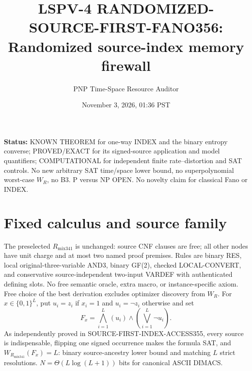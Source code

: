 \documentclass[11pt]{article}
\title{LSPV-4 RANDOMIZED-SOURCE-FIRST-FANO356: Randomized source-index memory firewall}
\author{PNP Time-Space Resource Auditor}
\date{November 3, 2026, 01:36 PST}
\begin{document}
\maketitle
\noindent\textbf{Status:} KNOWN THEOREM for one-way INDEX and the binary entropy converse; PROVED/EXACT for its signed-source application and model quantifiers; COMPUTATIONAL for independent finite rate--distortion and SAT controls. No new arbitrary SAT time/space lower bound, no superpolynomial worst-case $W_R$, no B3. P versus NP OPEN. No novelty claim for classical Fano or INDEX.
\section*{Fixed calculus and source family}
The preselected $R_{\mathrm{mix341}}$ is unchanged: source CNF clauses are free; all other nodes have unit charge and at most two named proof premises. Rules are binary RES, local original-three-variable AND3, binary GF(2), checked LOCAL-CONVERT, and conservative source-independent two-input VARDEF with authenticated defining slots. No free semantic oracle, extra macro, or instance-specific axiom. Free choice of the best derivation excludes optimizer discovery from $W_R$. For $x\in\{0,1\}^L$, put $u_i=z_i$ if $x_i=1$ and $u_i=\neg z_i$ otherwise and set
\[
F_x=\bigwedge_{i=1}^L (u_i)\wedge(\bigvee_{i=1}^L\neg u_i).
\]
As independently proved in SOURCE-FIRST-INDEX-ACCESS355, every source is indispensable, flipping one signed occurrence makes the formula SAT, and $W_{R_{\mathrm{mix341}}}(F_x)=L$: binary source-ancestry lower bound and matching $L$ strict resolutions. $N=\Theta(L\log(L+1))$ bits for canonical ASCII DIMACS.
\end{document}
